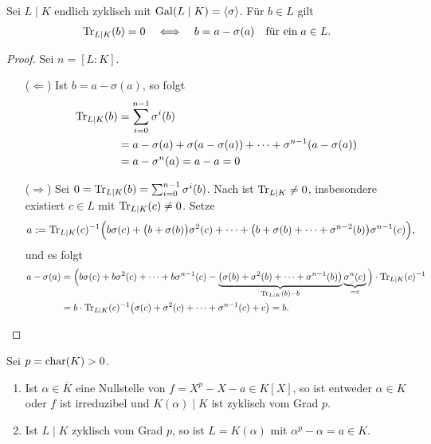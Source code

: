 \begin{proposition}
	Sei $L\mid K$ endlich zyklisch mit $\operatorname{Gal}(L\mid K) = \langle \sigma \rangle$. Für $b \in L$ gilt
	\begin{align*}
		\operatorname{Tr}_{L\mid K} (b) = 0 \quad \Longleftrightarrow \quad b = a - \sigma(a) \quad\text{für ein}\; a \in L.
	\end{align*}
\end{proposition}
\begin{proof}
	Sei $n = [L:K]$.
	\begin{itemize}[topsep=-6pt]
		\item[($\Leftarrow$)]
		Ist $b = a - \sigma(a)$, so folgt
		\begin{align*}
			\operatorname{Tr}_{L\mid K}(b) &= \sum_{i=0}^{n-1}\sigma^i(b)\\
			&= a - \sigma(a) + \sigma(a-\sigma(a)) + \dots + \sigma^{n-1}(a - \sigma(a))\\
			&= a - \sigma^n(a) = a - a = 0 
		\end{align*}
		\item[($\Rightarrow$)]
		Sei $0 = \operatorname{Tr}_{L\mid K} (b) = \sum_{i=0}^{n-1} \sigma^i(b)$. Nach  ist $\operatorname{Tr}_{L\mid K} \neq 0$, insbesondere existiert $c \in L$ mit $\operatorname{Tr}_{L\mid K}(c) \neq 0$. Setze
		\begin{align*}
			a &:= \operatorname{Tr}_{L\mid K} (c)^{-1}\Big(b\sigma(c) + \big(b+\sigma(b)\big)\sigma^2(c) + \dots + \big(b+\sigma(b) + \dots + \sigma^{n-2}(b)\big)\sigma^{n-1}(c)\Big),
		\end{align*}
		und es folgt
		\begin{align*}
			a- \sigma(a) &= \Big(b \sigma(c)+b\sigma^2(c) + \dots + b \sigma^{n-1}(c) - \underbrace{\big(\sigma(b)+\sigma^2(b)+ \dots + \sigma^{n-1}(b)\big)}_{\operatorname{Tr}_{L\mid K}(b)-b} \underbrace{\sigma^n(c)}_{=c}\Big) \cdot \operatorname{Tr}_{L\mid K}(c)^{-1}\\
			&= b \cdot \operatorname{Tr}_{L\mid K}(c)^{-1}\big(\sigma(c)+\sigma^2(c)+\dots+\sigma^{n-1}(c)+c\big) = b.
		\end{align*}
	\end{itemize}
\end{proof}
\begin{proposition}
	Sei $p = \operatorname{char}(K) > 0$.
	\begin{enumerate}[label={(\alph*)}]
		\item Ist $\alpha \in \overline{K}$ eine Nullstelle von $f = X^p - X - a \in K[X]$, so ist entweder $\alpha \in K$ oder $f$ ist irreduzibel und $K(\alpha)\mid K$ ist zyklisch vom Grad $p$.
		\item Ist $L \mid K$ zyklisch vom Grad $p$, so ist $L = K(\alpha)$ mit $\alpha^p - \alpha = a \in K$.
	\end{enumerate}
\end{proposition}
